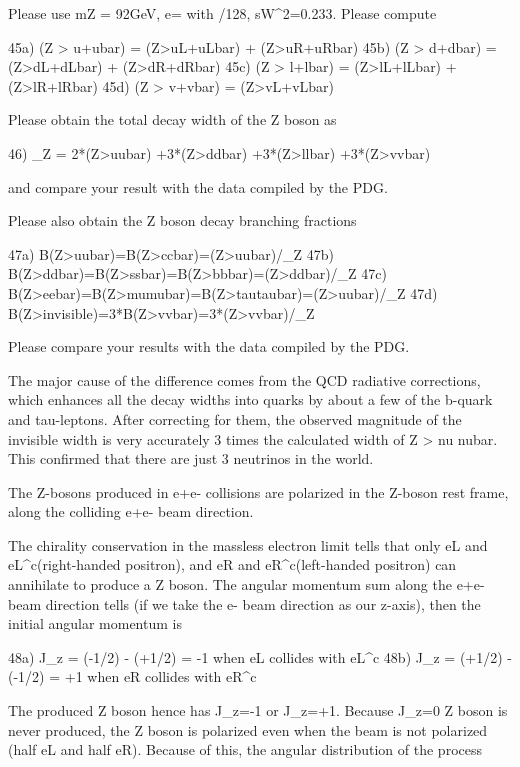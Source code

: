 \documentclass[12pt]{article}
\begin{document}
{{Please use mZ = 92GeV, e= with /128,
sW^2=0.233.  Please compute

45a) \Gamma(Z > u+ubar) = \Gamma(Z>uL+uLbar) + \Gamm(Z>uR+uRbar)
45b) \Gamma(Z > d+dbar) = \Gamma(Z>dL+dLbar) + \Gamm(Z>dR+dRbar)
45c) \Gamma(Z > l+lbar) = \Gamma(Z>lL+lLbar) + \Gamm(Z>lR+lRbar)
45d) \Gamma(Z > v+vbar) = \Gamma(Z>vL+vLbar)

Please obtain the total decay width of the Z boson as

46) \Gamma_Z = 2*\Gamma(Z>uubar)
              +3*\Gamma(Z>ddbar)
              +3*\Gamma(Z>llbar)
              +3*\Gamma(Z>vvbar)

and compare your result with the data compiled by the PDG.

Please also obtain the Z boson decay branching fractions

47a) B(Z>uubar)=B(Z>ccbar)=\Gamma(Z>uubar)/\Gamma_Z
47b) B(Z>ddbar)=B(Z>ssbar)=B(Z>bbbar)=\Gamma(Z>ddbar)/\Gamma_Z
47c) B(Z>eebar)=B(Z>mumubar)=B(Z>tautaubar)=\Gamma(Z>uubar)/\Gamma_Z
47d) B(Z>invisible)=3*B(Z>vvbar)=3*\Gamma(Z>vvbar)/\Gamma_Z

Please compare your results with the data compiled by the PDG.

The major cause of the difference comes from the QCD radiative
corrections, which enhances all the decay widths into quarks
by about a few %
of the b-quark and tau-leptons.  After correcting for them,
the observed magnitude of the invisible width is very accurately
3 times the calculated width of Z > nu nubar.  This confirmed
that there are just 3 neutrinos in the world.

The Z-bosons produced in e+e- collisions are polarized in
the Z-boson rest frame, along the colliding e+e- beam direction.

The chirality conservation in the massless electron limit tells
that only eL and eL^c(right-handed positron), and
eR and eR^c(left-handed positron) can annihilate to produce a
Z boson.  The angular momentum sum along the e+e- beam
direction tells (if we take the e- beam direction as our
z-axis), then the initial angular momentum is

48a) J_z = (-1/2) - (+1/2) = -1  when eL collides with eL^c
48b) J_z = (+1/2) - (-1/2) = +1  when eR collides with eR^c

The produced Z boson hence has J_z=-1 or J_z=+1.
Because J_z=0 Z boson is never produced, the Z boson is
polarized even when the beam is not polarized (half eL
and half eR).  Because of this, the angular distribution
of the process

}}
\end{document}
